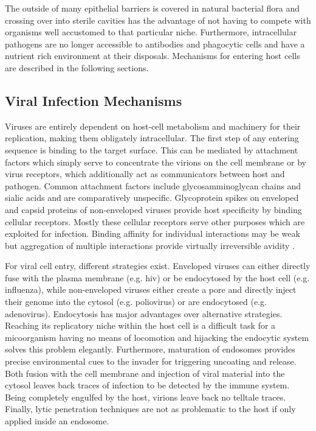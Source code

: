 The outside of many epithelial barriers is covered in natural bacterial flora and crossing over into sterile cavities has the advantage of not having to compete with organisms well accustomed to that particular niche. Furthermore, intracellular pathogens are no longer accessible to antibodies and phagocytic cells and have a nutrient rich environment at their disposals. Mechanisms for entering host cells are described in the following sections.

\subsection{Viral Infection Mechanisms}

Viruses are entirely dependent on host-cell metabolism and machinery for their replication, making them obligately intracellular. The first step of any entering sequence is binding to the target surface. This can be mediated by attachment factors which simply serve to concentrate the virions on the cell membrane or by virus receptors, which additionally act as communicators between host and pathogen. Common attachment factors include glycosamminoglycan chains and sialic acids and are comparatively unspecific. Glycoprotein spikes on enveloped and capsid proteins of non-enveloped viruses provide host specificity by binding cellular receptors. Mostly these cellular receptors serve other purposes which are exploited for infection. Binding affinity for individual interactions may be weak but aggregation of multiple interactions provide virtually irreversible avidity \citep{Smith2012}.

For viral cell entry, different strategies exist. Enveloped viruses can either directly fuse with the plasma membrane (e.g. \gls{hiv}) or be endocytosed by the host cell (e.g. influenza), while non-enveloped viruses either create a pore and directly inject their genome into the cytosol (e.g. poliovirus) or are endocytosed (e.g. adenovirus). Endocytosis has major advantages over alternative strategies. Reaching its replicatory niche within the host cell is a difficult task for a micoorganism having no means of locomotion and hijacking the endocytic system solves this problem elegantly. Furthermore, maturation of endosomes provides precise environmental cues to the invader for triggering uncoating and release. Both fusion with the cell membrane and injection of viral material into the cytosol leaves back traces of infection to be detected by the immune system. Being completely engulfed by the host, virions leave back no telltale traces. Finally, lytic penetration techniques are not as problematic to the host if only applied inside an endosome.

